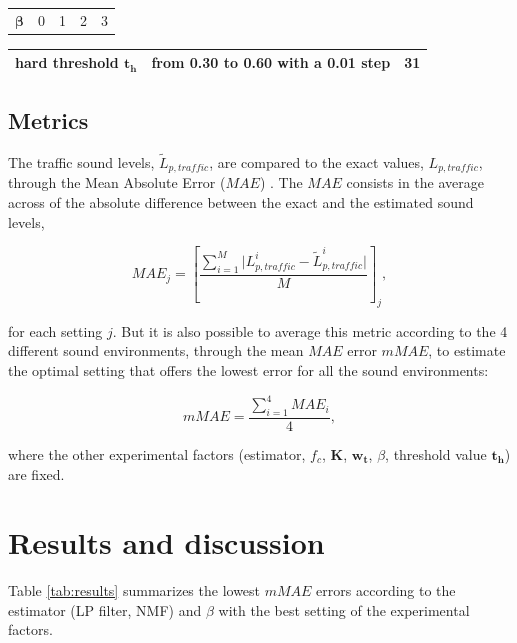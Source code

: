 \documentclass[review,5p,twocolumn,sort&compress,times]{elsarticle}
\begin{document}
\begin{table}[t]
\begin{tabularx}{17.5cm}{L{3cm}@{}C{4cm}@{}@{}C{4cm}@{}@{}C{4cm}@{}C{2cm}@{}}
   $\mathbf{\beta}$ & 0 & 1 & 2 & 3\\
\end{tabularx}

\begin{tabularx}{17.5cm}{L{3cm}@{}C{12cm}@{}C{2cm}@{}}
   hard threshold $\mathbf{t_h}$ & from 0.30 to 0.60 with a 0.01 step & 31\\
   \bottomrule
\end{tabularx}
\label{tab:experimental_factorsNMF}
\end{table}

\subsection{Metrics}

The traffic sound levels, $\tilde{L}_{p,traffic}$, are compared to the exact values, $L_{p,traffic}$, through the Mean Absolute Error ($MAE$) \cite{willmott2005advantages}. The $MAE$ consists in the average across of the absolute difference between the exact and the estimated sound levels,

\begin{equation}
MAE_j = \left[\frac{\sum_{i = 1}^{M} \vert L_{p,traffic}^i - \tilde{L}_{p,traffic}^i \vert}{M}\right]_j,
\end{equation}

for each setting $j$. But it is also possible to average this metric according to the 4 different sound environments, through the mean $MAE$ error $mMAE$, to estimate the optimal setting that offers the lowest error for all the sound environments:

\begin{equation}
mMAE = \frac{\sum_{i = 1}^4 MAE_i}{4},
\end{equation}

where the other experimental factors (estimator, $f_c$, $\mathbf{K}$, $\mathbf{w_t}$, $\beta$, threshold value $\mathbf{t_h}$) are fixed.


\section{Results and discussion}\label{part:results}

Table \ref{tab:results} summarizes the lowest $mMAE$ errors according to the estimator (LP filter, NMF) and $\beta$ with the best setting of the experimental factors.
\end{document}
